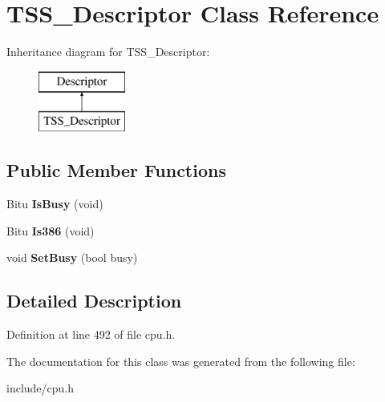 \hypertarget{classTSS__Descriptor}{\section{T\-S\-S\-\_\-\-Descriptor Class Reference}
\label{classTSS__Descriptor}
}
Inheritance diagram for T\-S\-S\-\_\-\-Descriptor\-:\begin{figure}[H]
\begin{center}
\leavevmode
\includegraphics[height=2.000000cm]{classTSS__Descriptor}
\end{center}
\end{figure}
\subsection*{Public Member Functions}
\begin{DoxyCompactItemize}
\item 
\hypertarget{classTSS__Descriptor_a82b10eaee6a4a7d2cab3da3ba7d8329e}{Bitu {\bfseries Is\-Busy} (void)}\label{classTSS__Descriptor_a82b10eaee6a4a7d2cab3da3ba7d8329e}

\item 
\hypertarget{classTSS__Descriptor_ad376baaa3d7f53d493eabb348616e467}{Bitu {\bfseries Is386} (void)}\label{classTSS__Descriptor_ad376baaa3d7f53d493eabb348616e467}

\item 
\hypertarget{classTSS__Descriptor_a2b1dfd33c948457d5cff749d1d5e3d47}{void {\bfseries Set\-Busy} (bool busy)}\label{classTSS__Descriptor_a2b1dfd33c948457d5cff749d1d5e3d47}

\end{DoxyCompactItemize}


\subsection{Detailed Description}


Definition at line 492 of file cpu.\-h.



The documentation for this class was generated from the following file\-:\begin{DoxyCompactItemize}
\item 
include/cpu.\-h\end{DoxyCompactItemize}
